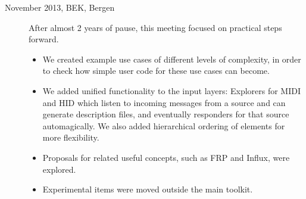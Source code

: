 \documentclass{article}
\begin{document}
\begin{description}
	\item[November 2013, BEK, Bergen] After almost 2 years of pause, this meeting focused on practical steps forward. 
	\begin{itemize}
		\item	We created example use cases of different levels of complexity, in order to check how simple user code for these use cases can become. 
		\item 	We added unified functionality to the input layers: Explorers for MIDI and HID which listen to incoming messages from a source and can generate description files, and eventually responders for that source automagically. We also added hierarchical ordering of elements for more flexibility. 
		\item 	Proposals for related useful concepts, such as FRP and Influx, were explored.
		\item	Experimental items were moved outside the main toolkit.
	\end{itemize}
		
		
		
		

\end{description}
\end{document}
